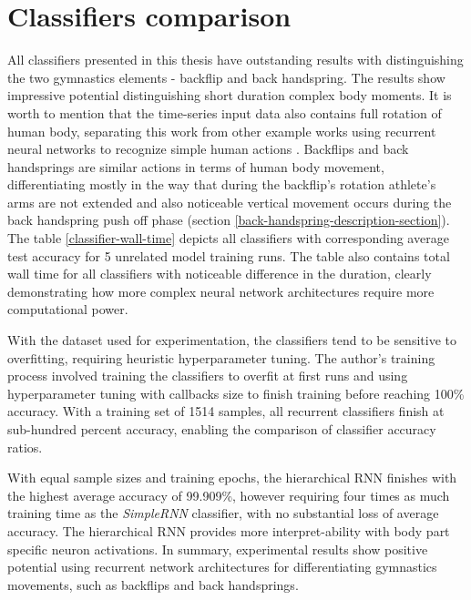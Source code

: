 \begin{comment}

\end{comment}

\section{Classifiers comparison}

All classifiers presented in this thesis have outstanding results with distinguishing the two gymnastics elements - backflip and back handspring. The results show impressive potential distinguishing short duration complex body moments. It is worth to mention that the time-series input data also contains full rotation of human body, separating this work from other example works using recurrent neural networks to recognize simple human actions \cite{sawant2020human}. Backflips and back handsprings are similar actions in terms of human body movement, differentiating mostly in the way that during the backflip's rotation athlete's arms are not extended and also noticeable vertical movement occurs during the back handspring push off phase (section \ref{back-handspring-description-section}). The table \ref{classifier-wall-time} depicts all classifiers with corresponding average test accuracy for 5 unrelated model training runs. The table also contains total wall time for all classifiers with noticeable difference in the duration, clearly demonstrating how more complex neural network architectures require more computational power. 

With the dataset used for experimentation, the classifiers tend to be sensitive to overfitting, requiring heuristic hyperparameter tuning. The author's training process involved training the classifiers to overfit at first runs and using hyperparameter tuning with callbacks size to finish training before reaching 100\% accuracy. With a training set of 1514 samples, all recurrent classifiers finish at sub-hundred percent accuracy, enabling the comparison of classifier accuracy ratios.

With equal sample sizes and training epochs, the hierarchical RNN finishes with the highest average accuracy of 99.909\%, however requiring four times as much training time as the \textit{SimpleRNN} classifier, with no substantial loss of average accuracy. The hierarchical RNN provides more interpret-ability with body part specific neuron activations. In summary, experimental results show positive potential using recurrent network architectures for differentiating gymnastics movements, such as backflips and back handsprings. 

